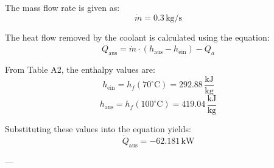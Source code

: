 The mass flow rate is given as:  
\[
\dot{m} = 0.3 \, \text{kg/s}
\]  

The heat flow removed by the coolant is calculated using the equation:  
\[
\dot{Q}_{\text{aus}} = \dot{m} \cdot (h_{\text{aus}} - h_{\text{ein}}) - \dot{Q}_a
\]  

From Table A2, the enthalpy values are:  
\[
h_{\text{ein}} = h_f(70^\circ\text{C}) = 292.88 \, \frac{\text{kJ}}{\text{kg}}
\]  
\[
h_{\text{aus}} = h_f(100^\circ\text{C}) = 419.04 \, \frac{\text{kJ}}{\text{kg}}
\]  

Substituting these values into the equation yields:  
\[
\dot{Q}_{\text{aus}} = -62.181 \, \text{kW}
\]  

---